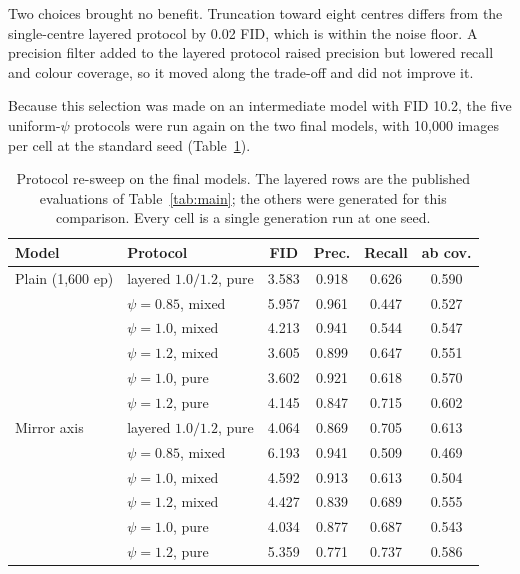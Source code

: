 \documentclass[electronics,article,submit,pdftex,moreauthors]{Definitions/mdpi}
\begin{document}
Two choices brought no benefit. Truncation toward eight centres differs from
the single-centre layered protocol by 0.02 FID, which is within the noise
floor. A precision filter added to the layered protocol raised precision but
lowered recall and colour coverage, so it moved along the trade-off and did
not improve it.

Because this selection was made on an intermediate model with FID 10.2, the
five uniform-$\psi$ protocols were run again on the two final models, with
10,000 images per cell at the standard seed (Table~\ref{tab:transfer}).

\begin{table}[H]
\caption{Protocol re-sweep on the final models. The layered rows are the
published evaluations of Table~\ref{tab:main}; the others were generated
for this comparison. Every cell is a single generation run at one seed.}
\label{tab:transfer}
\begin{tabular}{llcccc}
\toprule
\textbf{Model} & \textbf{Protocol} & \textbf{FID} & \textbf{Prec.} &
\textbf{Recall} & \textbf{ab cov.} \\
\midrule
Plain (1,600 ep) & layered $1.0/1.2$, pure & 3.583 & 0.918 & 0.626 & 0.590 \\
                  & $\psi = 0.85$, mixed    & 5.957 & 0.961 & 0.447 & 0.527 \\
                  & $\psi = 1.0$, mixed     & 4.213 & 0.941 & 0.544 & 0.547 \\
                  & $\psi = 1.2$, mixed     & 3.605 & 0.899 & 0.647 & 0.551 \\
                  & $\psi = 1.0$, pure      & 3.602 & 0.921 & 0.618 & 0.570 \\
                  & $\psi = 1.2$, pure      & 4.145 & 0.847 & 0.715 & 0.602 \\
\midrule
Mirror axis           & layered $1.0/1.2$, pure & 4.064 & 0.869 & 0.705 & 0.613 \\
                  & $\psi = 0.85$, mixed    & 6.193 & 0.941 & 0.509 & 0.469 \\
                  & $\psi = 1.0$, mixed     & 4.592 & 0.913 & 0.613 & 0.504 \\
                  & $\psi = 1.2$, mixed     & 4.427 & 0.839 & 0.689 & 0.555 \\
                  & $\psi = 1.0$, pure      & 4.034 & 0.877 & 0.687 & 0.543 \\
                  & $\psi = 1.2$, pure      & 5.359 & 0.771 & 0.737 & 0.586 \\
\bottomrule
\end{tabular}
\end{table}
\end{document}
